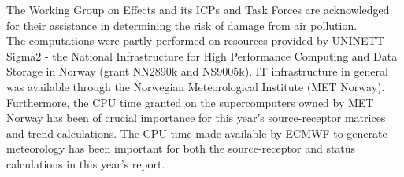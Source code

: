 The Working Group on Effects and its ICPs and Task Forces are
acknowledged for their assistance in determining the risk of damage
from air pollution.\\

The computations were partly performed on resources provided by 
UNINETT Sigma2 - the National Infrastructure for High Performance Computing and 
Data Storage in Norway (grant NN2890k and NS9005k). IT infrastructure in general was available through the Norwegian Meteorological Institute (MET Norway). Furthermore, the CPU time granted on the
\newpage
\noindent supercomputers owned by MET Norway has been of crucial importance for this year's source-receptor matrices and trend calculations. The CPU time made available by ECMWF to generate meteorology has been important for both the source-receptor and status calculations in this year's report.\\



